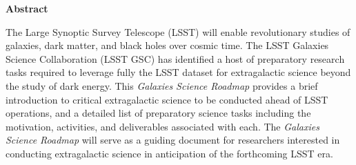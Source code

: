 

\vspace*{30mm}
\begin{center}
{\bf Abstract} 
\end{center}
\vspace*{5mm}

{\justify
The Large Synoptic Survey Telescope (LSST) will enable revolutionary studies of
galaxies, dark matter, and black holes over cosmic time. The
LSST Galaxies Science Collaboration (LSST GSC) has identified a host of preparatory research tasks required 
to leverage fully the LSST dataset for extragalactic science beyond the study of dark energy.
This {\it Galaxies Science Roadmap} provides a brief introduction to critical extragalactic science to be conducted ahead of LSST operations, and a detailed list of preparatory science tasks including the motivation, activities, and deliverables associated with each. The {\it Galaxies Science Roadmap} will serve as a guiding document for researchers interested in conducting extragalactic science in anticipation of the forthcoming LSST era.
}
